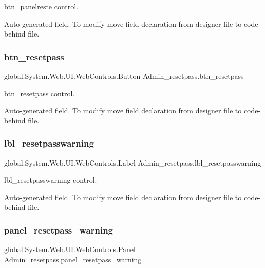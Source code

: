 btn\+\_\+panelreste control. 

Auto-\/generated field. To modify move field declaration from designer file to code-\/behind file. \mbox{\label{class_admin__resetpass_acc15dd3ae76be095cdb1b341aa0b2116}} 
\subsubsection{\texorpdfstring{btn\_resetpass}{btn\_resetpass}}
{\footnotesize\ttfamily global.\+System.\+Web.\+U\+I.\+Web\+Controls.\+Button Admin\+\_\+resetpass.\+btn\+\_\+resetpass\hspace{0.3cm}{\ttfamily [protected]}}



btn\+\_\+resetpass control. 

Auto-\/generated field. To modify move field declaration from designer file to code-\/behind file. \mbox{\label{class_admin__resetpass_aaa804b549e7272b5a4f219450dc25285}} 
\subsubsection{\texorpdfstring{lbl\_resetpasswarning}{lbl\_resetpasswarning}}
{\footnotesize\ttfamily global.\+System.\+Web.\+U\+I.\+Web\+Controls.\+Label Admin\+\_\+resetpass.\+lbl\+\_\+resetpasswarning\hspace{0.3cm}{\ttfamily [protected]}}



lbl\+\_\+resetpasswarning control. 

Auto-\/generated field. To modify move field declaration from designer file to code-\/behind file. \mbox{\label{class_admin__resetpass_acb62fa4ed3feaff8b6badd4a9c7bf474}} 
\subsubsection{\texorpdfstring{panel\_resetpass\_warning}{panel\_resetpass\_warning}}
{\footnotesize\ttfamily global.\+System.\+Web.\+U\+I.\+Web\+Controls.\+Panel Admin\+\_\+resetpass.\+panel\+\_\+resetpass\+\_\+warning\hspace{0.3cm}{\ttfamily [protected]}}




